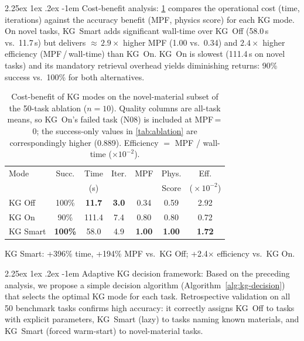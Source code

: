 \documentclass[preprint,review,12pt]{elsarticle}
\makeatletter
\renewcommand\paragraph{\@startsection{paragraph}{4}{\z@}%
  {2.25ex \@plus1ex \@minus.2ex}%
  {-1em}%
  {\normalfont\normalsize\bfseries}}
\newif\ifrevisionsvisible
\newcommand{\revised}[1]{%
  \ifrevisionsvisible\textcolor{revisionred}{#1}\else#1\fi}
\makeatother
\begin{document}
\paragraph{Cost-benefit analysis:}
\cref{tab:cost-benefit} compares the operational cost (time, iterations)
against the accuracy benefit (MPF, physics score) for each KG mode.
On novel tasks, KG~Smart adds significant wall-time over KG~Off
(58.0\,s vs.\ 11.7\,s) but delivers ${\approx}\,2.9\times$ higher
MPF (1.00 vs.\ 0.34) and $2.4\times$ higher efficiency
(MPF\,/\,wall-time) than KG~On.  KG~On is slowest (111.4\,s on novel
tasks) and its mandatory retrieval overhead yields diminishing returns:
90\% success vs.\ 100\% for both alternatives.

\begin{table}[t]
\centering
\caption{Cost-benefit of KG modes on the novel-material subset of the
50-task ablation ($n{=}10$).  \revised{Quality columns are all-task means, so
KG~On's failed task (N08) is included at MPF\,=\,0; the success-only
values in \cref{tab:ablation} are correspondingly higher (0.889).}
Efficiency $=$ MPF / wall-time ($\times10^{-2}$).}
\label{tab:cost-benefit}
\footnotesize
\setlength{\tabcolsep}{3.5pt}
\begin{tabular}{@{}lcccccc@{}}
\toprule
Mode & Succ. & Time & Iter. & MPF & Phys. & Eff. \\
     &       & (s)  &       &     & Score & ($\!\times\!10^{-2}$) \\
\midrule
KG Off   & 100\% & \textbf{11.7} & \textbf{3.0} & 0.34 & 0.59 & 2.92 \\
KG On    &  90\% & 111.4 & 7.4 & 0.80 & 0.80 & 0.72 \\
KG Smart & \textbf{100\%} & 58.0 & 4.9 & \textbf{1.00} & \textbf{1.00} & \textbf{1.72} \\
\bottomrule
\end{tabular}

\vspace{0.3em}
{\scriptsize KG Smart: +396\% time, +194\% MPF vs.\ KG Off; +2.4$\times$ efficiency vs.\ KG On.}
\end{table}

\paragraph{Adaptive KG decision framework:}
Based on the preceding analysis, we propose a simple decision algorithm
(Algorithm~\ref{alg:kg-decision}) that selects the optimal KG mode for
each task.  Retrospective validation on all 50 benchmark tasks
confirms high accuracy: it correctly assigns KG~Off to tasks with
explicit parameters, KG~Smart (lazy) to tasks naming known materials,
and KG~Smart (forced warm-start) to novel-material tasks.
\end{document}
